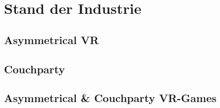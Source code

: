 \chapter{Stand der Industrie}

\section{Asymmetrical VR}

\section{Couchparty}

\section{Asymmetrical \& Couchparty VR-Games}


